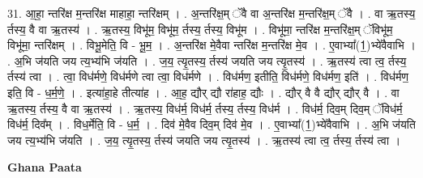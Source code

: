 \documentclass[17pt]{extarticle}
\begin{document}
31. आ॒हा॒ न्तरि॑क्ष म॒न्तरि॑क्ष माहाहा॒ न्तरि॑क्षम् । . अ॒न्तरि॑क्ष॒म् ॅवै वा अ॒न्तरि॑क्ष म॒न्तरि॑क्ष॒म् ॅवै । . वा ऋ॒तस्य॒ र्तस्य॒ वै वा ऋ॒तस्य॑ । . ऋ॒तस्य॒ विभू॑म॒ विभू॑म॒ र्तस्य॒ र्तस्य॒ विभू॑म । . विभू॑मा॒ न्तरि॑क्ष म॒न्तरि॑क्ष॒म् ॅविभू॑म॒ विभू॑मा॒ न्तरि॑क्षम् । . विभू॒मेति॒ वि - भू॒म॒ । . अ॒न्तरि॑क्ष मे॒वैवा न्तरि॑क्ष म॒न्तरि॑क्ष मे॒व । . ए॒वाभ्या᳚(1॒)भ्ये॑वैवाभि । . अ॒भि ज॑यति जय त्य॒भ्य॑भि ज॑यति । . ज॒य॒ त्यृ॒तस्य॒ र्तस्य॑ जयति जय त्यृ॒तस्य॑ । . ऋ॒तस्य॑ त्वा त्व॒ र्तस्य॒ र्तस्य॑ त्वा । . त्वा॒ विध॑र्मणे॒ विध॑र्मणे त्वा त्वा॒ विध॑र्मणे । . विध॑र्मण॒ इतीति॒ विध॑र्मणे॒ विध॑र्मण॒ इति॑ । . विध॑र्मण॒ इति॒ वि - ध॒र्म॒णे॒ । . इत्या॑हा॒हे तीत्या॑ह । . आ॒ह॒ द्यौर् द्यौ रा॑हाह॒ द्यौः । . द्यौर् वै वै द्यौर् द्यौर् वै । . वा ऋ॒तस्य॒ र्तस्य॒ वै वा ऋ॒तस्य॑ । . ऋ॒तस्य॒ विध॑र्म॒ विध॑र्म॒ र्तस्य॒ र्तस्य॒ विध॑र्म । . विध॑र्म॒ दिव॒म् दिव॒म् ॅविध॑र्म॒ विध॑र्म॒ दिव᳚म् । . विध॒र्मेति॒ वि - ध॒र्म॒ । . दिव॑ मे॒वैव दिव॒म् दिव॑ मे॒व । . ए॒वाभ्या᳚(1॒)भ्ये॑वैवाभि । . अ॒भि ज॑यति जय त्य॒भ्य॑भि ज॑यति । . ज॒य॒ त्यृ॒तस्य॒ र्तस्य॑ जयति जय त्यृ॒तस्य॑ । . ऋ॒तस्य॑ त्वा त्व॒ र्तस्य॒ र्तस्य॑ त्वा । \newline

\textbf{Ghana Paata } \newline
\end{document}
